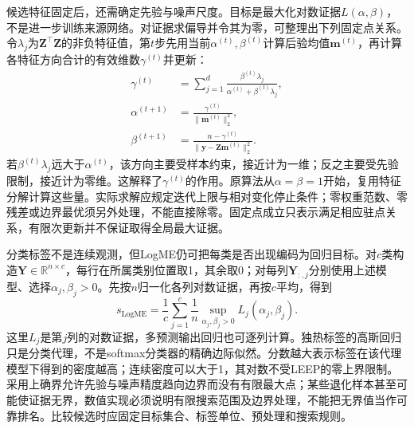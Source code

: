 候选特征固定后，还需确定先验与噪声尺度。目标是最大化对数证据$L(\alpha,\beta)$，不是进一步训练来源网络。对证据求偏导并令其为零，可整理出下列固定点关系。令$\lambda_j$为$\bm Z^\top\bm Z$的非负特征值，第$t$步先用当前$\alpha^{(t)},\beta^{(t)}$计算后验均值$\bm m^{(t)}$，再计算各特征方向合计的有效维数$\gamma^{(t)}$并更新：
\begin{equation}
  \begin{aligned}
    \gamma^{(t)}&=\sum_{j=1}^{d}
       \frac{\beta^{(t)}\lambda_j}{\alpha^{(t)}+\beta^{(t)}\lambda_j},\\
    \alpha^{(t+1)}&=
       \frac{\gamma^{(t)}}{\lVert\bm m^{(t)}\rVert_2^2},\\
    \beta^{(t+1)}&=
       \frac{n-\gamma^{(t)}}{\lVert\bm y-\bm Z\bm m^{(t)}\rVert_2^2}.
  \end{aligned}
  \label{eq:ket-reuse-logme-update}
\end{equation}
若$\beta^{(t)}\lambda_j$远大于$\alpha^{(t)}$，该方向主要受样本约束，接近计为一维；反之主要受先验限制，接近计为零维。这解释了$\gamma^{(t)}$的作用。原算法从$\alpha=\beta=1$开始，复用特征分解计算这些量。实际求解应规定迭代上限与相对变化停止条件；零权重范数、零残差或边界最优须另外处理，不能直接除零。固定点成立只表示满足相应驻点关系，有限次更新并不保证取得全局最大证据。

分类标签不是连续观测，但LogME仍可把每类是否出现编码为回归目标。对$c$类构造$\bm Y\in\mathbb R^{n\times c}$，每行在所属类别位置取1，其余取0；对每列$\bm Y_{:,j}$分别使用上述模型、选择$\alpha_j,\beta_j>0$。先按$n$归一化各列对数证据，再按$c$平均，得到
\begin{equation}
  s_{\mathrm{LogME}}
  =\frac1c\sum_{j=1}^{c}\frac1n
    \sup_{\alpha_j,\beta_j>0}
    L_j(\alpha_j,\beta_j).
  \label{eq:ket-reuse-logme-score}
\end{equation}
这里$L_j$是第$j$列的对数证据，多预测输出回归也可逐列计算。独热标签的高斯回归只是分类代理，不是softmax分类器的精确边际似然。分数越大表示标签在该代理模型下得到的密度越高；连续密度可以大于1，其对数不受LEEP的零上界限制。采用上确界允许先验与噪声精度趋向边界而没有有限最大点；某些退化样本甚至可能使证据无界，数值实现必须说明有限搜索范围及边界处理，不能把无界值当作可靠排名。比较候选时应固定目标集合、标签单位、预处理和搜索规则。


